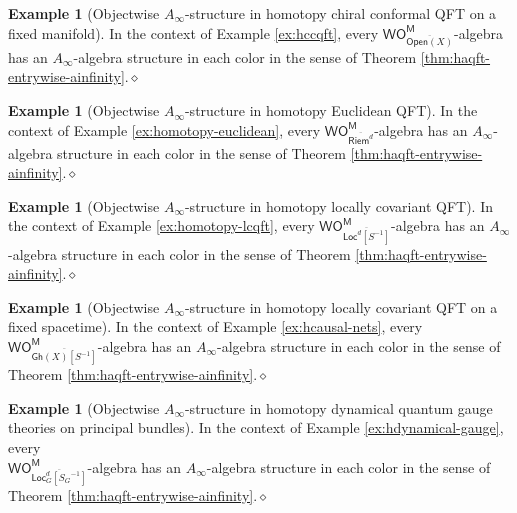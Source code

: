 \documentclass{amsbook}
\numberwithin{section}{chapter}
\numberwithin{subsection}{section}
\numberwithin{equation}{section}
\theoremstyle{plain}
\theoremstyle{definition}
\newtheorem{example}[equation]{Example}
\newcommand{\M}{\mathsf{M}}
\renewcommand{\O}{\mathsf{O}}
\newcommand{\Otom}{\O^{\M}}
\newcommand{\W}{\mathsf{W}}
\newcommand{\dqed}{\hfill$\diamond$}
\newcommand{\inv}[1]{{#1}^{-1}}
\newcommand{\Sinv}{\inv{S}}
\newcommand{\Bgloc}{\Locd_G}
\newcommand{\Bglocsginv}{\Bgloc[\inv{S_G}]}
\newcommand{\Bglocsginvbar}{\overline{\Bglocsginv}}
\newcommand{\Gh}{\mathsf{Gh}}
\newcommand{\Ghx}{\Gh(X)}
\newcommand{\Ghxsinvbar}{\overline{\Ghx[\Sinv]}}
\newcommand{\Loc}{\mathsf{Loc}}
\newcommand{\Locd}{\Loc^d}
\newcommand{\Locdsinv}{\Locd[\Sinv]}
\newcommand{\Locdsinvbar}{\overline{\Locdsinv}}
\newcommand{\Open}{\mathsf{Open}}
\newcommand{\Openx}{\Open(X)}
\newcommand{\Openxbar}{\overline{\Openx}}
\newcommand{\Riem}{\mathsf{Riem}}
\newcommand{\Riemd}{\Riem^d}
\newcommand{\Riemdbar}{\overline{\Riemd}}
\newcommand{\wom}{\W\Otom}
\begin{document}
\begin{example}[Objectwise $A_\infty$-structure in homotopy chiral conformal QFT on a fixed manifold]\label{ex:ainfinity-hccqft-manifold}
In the context of Example \ref{ex:hccqft}, every $\wom_{\Openxbar}$-algebra has an $A_\infty$-algebra structure in each color in the sense of Theorem \ref{thm:haqft-entrywise-ainfinity}.\dqed
\end{example}

\begin{example}[Objectwise $A_\infty$-structure in homotopy Euclidean QFT]\label{ex:ainfinity-euclidean}
In the context of Example \ref{ex:homotopy-euclidean}, every $\wom_{\Riemdbar}$-algebra has an $A_\infty$-algebra structure in each color in the sense of Theorem \ref{thm:haqft-entrywise-ainfinity}.\dqed
\end{example}

\begin{example}[Objectwise $A_\infty$-structure in homotopy locally covariant QFT]\label{ex:ainfinity-hlcqft}
In the context of Example \ref{ex:homotopy-lcqft}, every $\wom_{\Locdsinvbar}$-algebra has an $A_\infty$-algebra structure in each color in the sense of Theorem \ref{thm:haqft-entrywise-ainfinity}.\dqed
\end{example}

\begin{example}[Objectwise $A_\infty$-structure in homotopy locally covariant QFT on a fixed spacetime]\label{ex:ainfinity-hlcqft-fixed}
In the context of Example \ref{ex:hcausal-nets}, every  $\wom_{\Ghxsinvbar}$-algebra has an $A_\infty$-algebra structure in each color in the sense of Theorem \ref{thm:haqft-entrywise-ainfinity}.\dqed
\end{example}

\begin{example}[Objectwise $A_\infty$-structure in homotopy dynamical quantum gauge theories on principal bundles]\label{ex:ainfinity-dynamical}
In the context of Example \ref{ex:hdynamical-gauge},  every\\ $\wom_{\Bglocsginvbar}$-algebra has an $A_\infty$-algebra structure in each color in the sense of Theorem \ref{thm:haqft-entrywise-ainfinity}.\dqed
\end{example}
\end{document}
